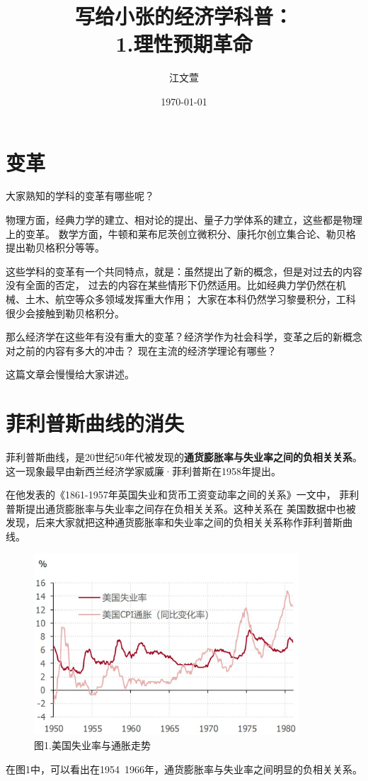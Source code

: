 \documentclass[UTF8]{ctexart}
\title{写给小张的经济学科普： \\ 1.理性预期革命}
\author{江文萱}
\date{\today}
\begin{document}
\maketitle

\section{变革}
    大家熟知的学科的变革有哪些呢？\par
    物理方面，经典力学的建立、相对论的提出、量子力学体系的建立，这些都是物理上的变革。
    数学方面，牛顿和莱布尼茨创立微积分、康托尔创立集合论、勒贝格提出勒贝格积分等等。\par
    这些学科的变革有一个共同特点，就是：虽然提出了新的概念，但是对过去的内容没有全面的否定，
    过去的内容在某些情形下仍然适用。比如经典力学仍然在机械、土木、航空等众多领域发挥重大作用；
    大家在本科仍然学习黎曼积分，工科很少会接触到勒贝格积分。\par
    那么经济学在这些年有没有重大的变革？经济学作为社会科学，变革之后的新概念对之前的内容有多大的冲击？
    现在主流的经济学理论有哪些？\par
    这篇文章会慢慢给大家讲述。

\section{菲利普斯曲线的消失}
    菲利普斯曲线，是20世纪50年代被发现的\textbf{通货膨胀率与失业率之间的负相关关系}。
    这一现象最早由新西兰经济学家威廉·菲利普斯在1958年提出。\par
    在他发表的《1861-1957年英国失业和货币工资变动率之间的关系》一文中，
    菲利普斯提出通货膨胀率与失业率之间存在负相关关系。这种关系在
    美国数据中也被发现，后来大家就把这种通货膨胀率和失业率之间的负相关关系称作菲利普斯曲线。
    \begin{figure}[H]
        \centering
        \includegraphics[width=9.9cm,height=6.8cm]{美国失业率与通胀走势.jpg}
        \caption{图1.美国失业率与通胀走势}
    \end{figure} 
    在图1中，可以看出在1954~1966年，通货膨胀率与失业率之间明显的负相关关系。
\end{document}
